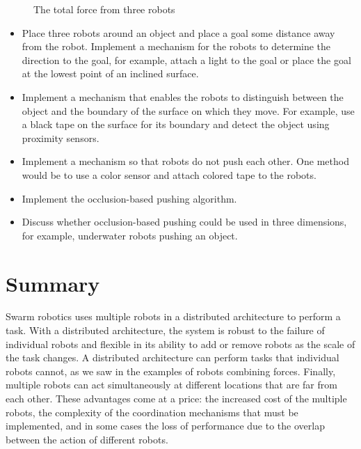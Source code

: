 \begin{figure}
\begin{center}
\caption{The total force from three robots}\label{fig.total-force}
\end{center}
\end{figure}

\begin{framed}
\begin{itemize}
\item Place three robots around an object and place a goal some distance away from the robot. Implement a mechanism for the robots to determine the direction to the goal, for example, attach a light to the goal or place the goal at the lowest point of an inclined surface.
\item Implement a mechanism that enables the robots to distinguish between the object and the boundary of the surface on which they move. For example, use a black tape on the surface for its boundary and detect the object using proximity sensors.
\item Implement a mechanism so that robots do not push each other. One method would be to use a color sensor and attach colored tape to the robots.
\item Implement the occlusion-based pushing algorithm.
\item Discuss whether occlusion-based pushing could be used in three dimensions, for example, underwater robots pushing an object.
\end{itemize}
\end{framed}

\section{Summary}

Swarm robotics uses multiple robots in a distributed architecture to perform a task. With a distributed architecture, the system is robust to the failure of individual robots and flexible in its ability to add or remove robots as the scale of the task changes. A distributed architecture can perform tasks that individual robots cannot, as we saw in the examples of robots combining forces. Finally, multiple robots can act simultaneously at different locations that are far from each other. These advantages come at a price: the increased cost of the multiple robots, the complexity of the coordination mechanisms that must be implemented, and in some cases the loss of performance due to the overlap between the action of different robots. 


